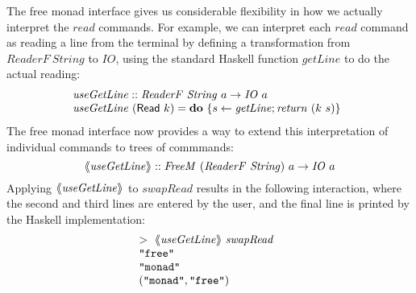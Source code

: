 \documentclass{jfp1}
\newcommand{\fmext}[1]{\langle\kern-0.25em\langle #1 \rangle\kern-0.25em\rangle}
\newcommand{\kw}[1]{\textbf{#1}}
\begin{document}
The free monad interface gives us considerable flexibility in how we
actually interpret the $\mathit{read}$ commands. For example, we can
interpret each $\mathit{read}$ command as reading a line from the
terminal by defining a transformation from
$\mathit{ReaderF}~\mathit{String}$ to $\mathit{IO}$, using the
standard Haskell function $\mathit{getLine}$ to do the actual reading:
\begin{displaymath}
  \begin{array}{@{}l}
    \mathit{useGetLine} :: \mathit{ReaderF}~\mathit{String}~a \to \mathit{IO}~a \\
    \mathit{useGetLine}~(\mathsf{Read}~k) = \kw{do}~\{ s \leftarrow \mathit{getLine}; \mathit{return}~(k~s) \}
  \end{array}
\end{displaymath}
The free monad interface now provides a way to extend this
interpretation of individual commands to trees of commmands:
\begin{displaymath}
  \fmext{\mathit{useGetLine}} :: \mathit{FreeM}~(\mathit{ReaderF}~\mathit{String})~a \to \mathit{IO}~a
\end{displaymath}
Applying $\fmext{\mathit{useGetLine}}$ to $\mathit{swapRead}$ results
in the following interaction, where the second and third lines are
entered by the user, and the final line is printed by the Haskell
implementation:
\begin{displaymath}
  \begin{array}{@{}l}
    >~\fmext{\mathit{useGetLine}}~\mathit{swapRead} \\
    \texttt{"free"} \\
    \texttt{"monad"} \\
    (\texttt{"monad"}, \texttt{"free"})
  \end{array}
\end{displaymath}
\end{document}
